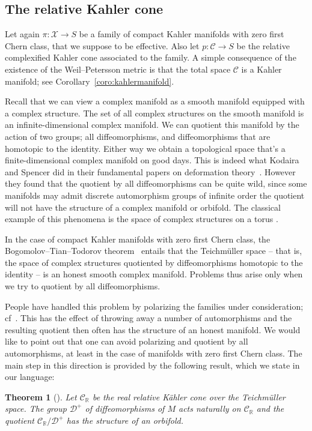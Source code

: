 \documentclass[11pt,a4paper]{amsart}
\newtheorem{theo}{Theorem}[section]
\theoremstyle{definition}
\theoremstyle{remark}
\newcommand{\RR}{\mathbb{R}}
\def\CX{\mathcal{X}}
\def\KC{C}
\def\RKC{\mathcal{\KC}}
\begin{document}
\subsection*{The relative Kahler cone}


Let again $\pi :\CX \to S$ be a family of compact Kahler manifolds with
zero first Chern class, that we suppose to be effective. Also let $p:
\RKC \to S$ be the relative complexified Kahler cone associated to the
family. A simple consequence of the existence of the Weil--Petersson
metric is that the total space $\RKC$ is a Kahler manifold; see
Corollary~\ref{coro:kahlermanifold}.


Recall that we can view a complex manifold as a smooth manifold equipped
with a complex structure. The set of all complex structures on the
smooth manifold is an infinite-dimensional complex manifold. We can
quotient this manifold by the action of two groups; all diffeomorphisms,
and diffeomorphisms that are homotopic to the identity. Either way we
obtain a topological space that's a finite-dimensional complex manifold
on good days. This is indeed what Kodaira and Spencer did in their
fundamental papers on deformation
theory~\cite{MR0112154,KodairaSpencerIII}.
However they found that the quotient by all diffeomorphisms can be quite
wild, since some manifolds may admit discrete automorphism groups of
infinite order the quotient will not have the structure of a complex
manifold or orbifold. The classical example of this phenomena is the
space of complex structures on a torus \cite[p. 413]{MR0112154}.

In the case of compact Kahler manifolds with zero first Chern class, the
Bogomolov--Tian--Todorov theorem~\cite{Tian} entails that the
Teichm\"uller space -- that is, the space of complex structures
quotiented by diffeomorphisms homotopic to the identity -- is an honest
smooth complex manifold. Problems thus arise only when we try to
quotient by all diffeomorphisms.

People have handled this problem by polarizing the families under
consideration; cf~\cite{MR756781}. This has the effect of throwing away a
number of automorphisms and the resulting quotient then often has the
structure of an honest manifold. We would like to point out that one can
avoid polarizing and quotient by all automorphisms, at least in the case
of manifolds with zero first Chern class. The main step in this
direction is provided by the following result, which we state in our
language:


\begin{theo}[{{\cite[Theorem 12.103]{MR2371700}}}]
Let $\mathcal{C}_\RR$ be the real relative K\"ahler cone over the
Teichm\"uller space. The group $\mathcal{D}^+$ of diffeomorphisms of $M$
acts naturally on $\mathcal{C}_\RR$ and the quotient $\mathcal{C}_\RR /
\mathcal{D}^+$ has the structure of an orbifold.
\end{theo}
\end{document}
